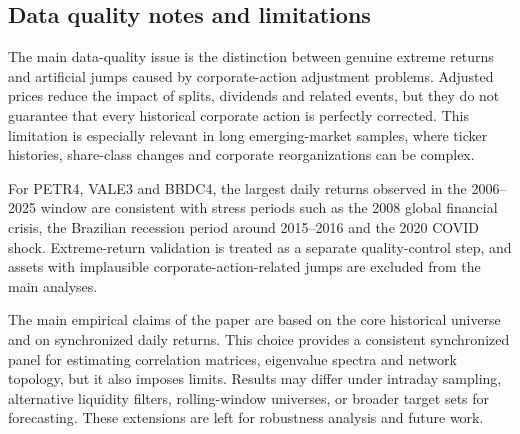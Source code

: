 \subsection{Data quality notes and limitations}

The main data-quality issue is the distinction between genuine extreme returns and artificial jumps caused by corporate-action adjustment problems. Adjusted prices reduce the impact of splits, dividends and related events, but they do not guarantee that every historical corporate action is perfectly corrected. This limitation is especially relevant in long emerging-market samples, where ticker histories, share-class changes and corporate reorganizations can be complex.

For PETR4, VALE3 and BBDC4, the largest daily returns observed in the 2006--2025 window are consistent with stress periods such as the 2008 global financial crisis, the Brazilian recession period around 2015--2016 and the 2020 COVID shock. Extreme-return validation is treated as a separate quality-control step, and assets with implausible corporate-action-related jumps are excluded from the main analyses.

The main empirical claims of the paper are based on the core historical universe and on synchronized daily returns. This choice provides a consistent synchronized panel for estimating correlation matrices, eigenvalue spectra and network topology, but it also imposes limits. Results may differ under intraday sampling, alternative liquidity filters, rolling-window universes, or broader target sets for forecasting. These extensions are left for robustness analysis and future work.
